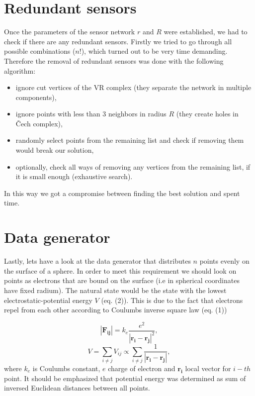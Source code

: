 \documentclass[a4paper, 12pt]{article}
\newcommand{\vect}[1]{\boldsymbol{#1}}
\begin{document}
\section{Redundant sensors}
Once the parameters of the sensor network $r$ and $R$ were established, we had to check if there are any redundant sensors. Firstly we tried to go through all possible combinations ($n!$), which turned out to be very time demanding. Therefore the removal of redundant sensors was done with the following algorithm:
\begin{itemize}
	\item ignore cut vertices of the VR complex (they separate the network in multiple components),
	\item ignore points with less than 3 neighbors in radius $R$ (they create holes in Čech complex),
	\item randomly select points from the remaining list and check if removing them would break our solution,
	\item optionally, check all ways of removing any vertices from the remaining list, if it is small enough (exhaustive search).
\end{itemize}
In this way we got a compromise between finding the best solution and spent time.
\section{Data generator}
Lastly, lets have a look at the data generator that distributes $n$ points evenly on the surface of a sphere. In order to meet this requirement we should look on points as electrons that are bound on the surface (i.e in spherical coordinates have fixed radium). The natural state would be the state with the lowest electrostatic-potential energy $V$ (eq. (2)). This is due to the fact that electrons repel from each other according to Coulumbs inverse square law (eq. (1))

\begin{equation}
	|\vect{F_{ij}}| = k_e \frac{e^2}{|\vect{r_i}-\vect{r_j}|^2},
\end{equation}
\begin{equation}
	V = \sum_{i\neq j}V_{ij} \propto \sum_{i\neq j}\frac{1}{|\vect{r_i} - \vect{r_j}|},
\end{equation}
where $k_e$ is Coulumbs constant, $e$ charge of electron and $\vect{r_i}$ local vector for $i-th$ point. It should be emphasized that potential energy was determined as sum of inversed Euclidean distances between all points. 
\end{document}
